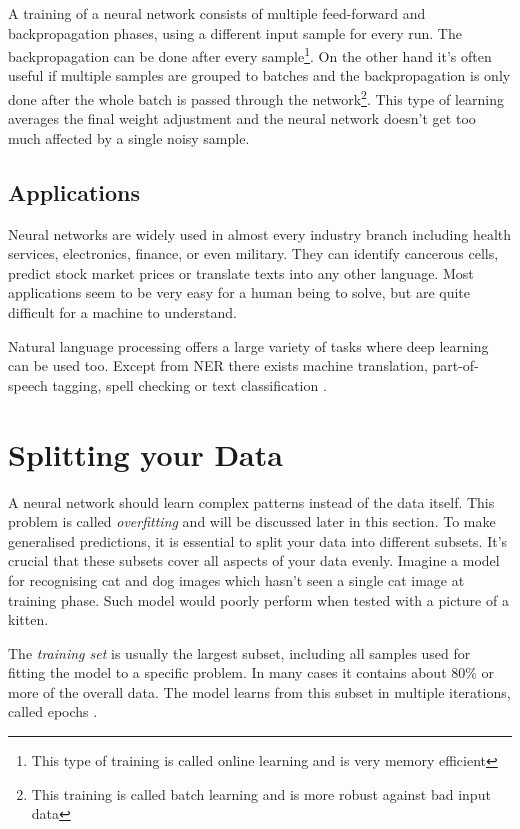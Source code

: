 A training of a neural network consists of multiple feed-forward and backpropagation phases, using a different input sample for every run. The backpropagation can be done after every sample\footnote{This type of training is called online learning and is very memory efficient}. On the other hand it's often useful if multiple samples are grouped to batches and the backpropagation is only done after the whole batch is passed through the network\footnote{This training is called batch learning and is more robust against bad input data}. This type of learning averages the final weight adjustment and the neural network doesn't get too much affected by a single noisy sample.

\subsection{Applications}

Neural networks are widely used in almost every industry branch including health services, electronics, finance, or even military. They can identify cancerous cells, predict stock market prices or translate texts into any other language. Most applications seem to be very easy for a human being to solve, but are quite difficult for a machine to understand.

Natural language processing offers a large variety of tasks where deep learning can be used too. Except from NER there exists machine translation, part-of-speech tagging, spell checking or text classification \cite{olga17}.

\section{Splitting your Data}

A neural network should learn complex patterns instead of the data itself. This problem is called \emph{overfitting} and will be discussed later in this section. To make generalised predictions, it is essential to split your data into different subsets. It's crucial that these subsets cover all aspects of your data evenly. Imagine a model for recognising cat and dog images which hasn't seen a single cat image at training phase. Such model would poorly perform when tested with a picture of a kitten.

The \emph{training set} is usually the largest subset, including all samples used for fitting the model to a specific problem. In many cases it contains about 80\% or more of the overall data. The model learns from this subset in multiple iterations, called epochs \cite{shah17}.

